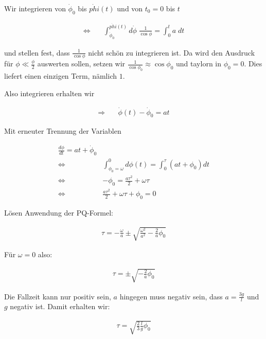 \documentclass[a4paper,german,12pt,smallheadings]{scrartcl}
\begin{document}
Wir integrieren von $\dot{\phi}_0$ bis $\dot{phi}(t)$ und von $t_0 = 0$ bis $t$

\begin{align*}
  \Leftrightarrow\quad&\int_{\dot{\phi}_0}^{\dot{phi}(t)} d \dot{\phi} \; \frac{1}{\cos \phi} = \int_0^{t} a \; dt
\end{align*}

und stellen fest, dass $\frac{1}{\cos \phi}$ nicht schön zu integrieren ist. Da
wird den Ausdruck für $\phi \ll \frac{\phi}{2}$ auswerten sollen, setzen wir
$\frac{1}{\cos \phi_0} \approx \cos \phi_0$ und taylorn in $\phi_0 = 0$. Dies
liefert einen einzigen Term, nämlich $1$.

Also integrieren erhalten wir

\begin{align*}
  \Rightarrow\quad&\dot{\phi}(t) -\dot{\phi}_0 = at
\end{align*}

Mit erneuter Trennung der Variablen

\begin{align*}
  \frac{d \phi}{dt} = at + \dot{\phi}_0\\
  \Leftrightarrow\quad& \int_{\phi_0 = \omega}^{0} d\phi(t) = \int_0^{\tau}(at + \phi_0) dt\\
  \Leftrightarrow\quad& -\phi_0 = \frac{a \tau^2}{2} + \omega \tau \\
  \Leftrightarrow\quad& \frac{a \tau^2}{2} + \omega \tau + \phi_0 = 0
\end{align*}

Lösen Anwendung der PQ-Formel:

\begin{align*}
  \tau = -\frac{\omega}{a} \pm \sqrt{\frac{\omega^2}{a^2} - \frac{2}{a} \phi_0}
\end{align*}

Für $\omega = 0$ also:

\begin{align*}
  \tau = \pm \sqrt{- \frac{2}{a} \phi_0}
\end{align*}

Die Fallzeit kann nur positiv sein, $a$ hingegen muss negativ sein, dass $a = \frac{3g}{l}$ und $g$ negativ ist. Damit erhalten wir:

\begin{align*}
  \tau = \sqrt{\frac{2}{3} \frac{l}{g} \phi_0}
\end{align*}
\end{document}
